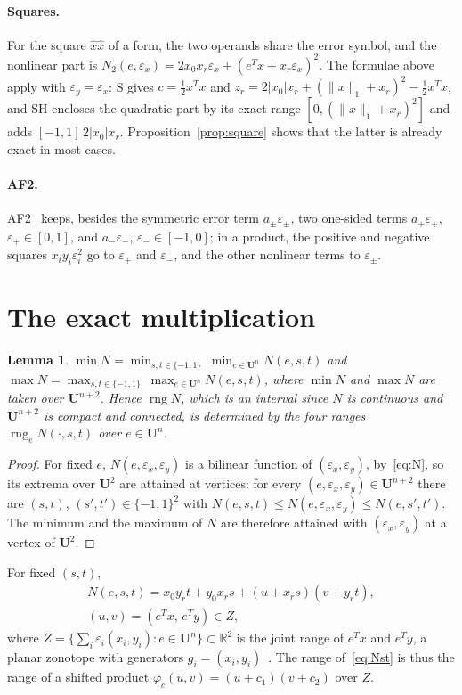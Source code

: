 \documentclass[10pt]{article}
\newtheorem{lemma}[theorem]{Lemma}
\theoremstyle{definition}
\newcommand{\U}{\mathbf{U}}
\newcommand{\R}{\mathbb{R}}
\newcommand{\eps}{\varepsilon}
\newcommand{\ex}{\eps_x}
\newcommand{\ey}{\eps_y}
\newcommand{\rng}{\operatorname{rng}}
\begin{document}
\paragraph{Squares.} For the square $\hat x\hat x$ of a form, the two operands share the error symbol, and the nonlinear part is $N_2(e,\ex)=2x_0x_r\ex+(e^Tx+x_r\ex)^2$. The formulae above apply with $\ey=\ex$: S gives $c=\tfrac12x^Tx$ and $z_r=2|x_0|x_r+(\|x\|_1+x_r)^2-\tfrac12x^Tx$, and SH encloses the quadratic part by its exact range $[0,(\|x\|_1+x_r)^2]$ and adds $[-1,1]\,2|x_0|x_r$. Proposition~\ref{prop:square} shows that the latter is already exact in most cases.

\paragraph{AF2.} AF2~\cite{messine2002extentions} keeps, besides the symmetric error term $a_\pm\eps_\pm$, two one-sided terms $a_+\eps_+$, $\eps_+\in[0,1]$, and $a_-\eps_-$, $\eps_-\in[-1,0]$; in a product, the positive and negative squares $x_iy_i\eps_i^2$ go to $\eps_+$ and $\eps_-$, and the other nonlinear terms to $\eps_\pm$.

\section{The exact multiplication}
\label{sec:exact}

\begin{lemma}
\label{lem:vertices}
$\min N = \min_{s,t\in\{-1,1\}}\ \min_{e\in\U^n} N(e,s,t)$ and $\max N = \max_{s,t\in\{-1,1\}}\ \max_{e\in\U^n} N(e,s,t)$, where $\min N$ and $\max N$ are taken over $\U^{n+2}$. Hence $\rng N$, which is an interval since $N$ is continuous and $\U^{n+2}$ is compact and connected, is determined by the four ranges $\rng_e N(\cdot,s,t)$ over $e\in\U^n$.
\end{lemma}
\begin{proof}
For fixed $e$, $N(e,\ex,\ey)$ is a bilinear function of $(\ex,\ey)$, by~\eqref{eq:N}, so its extrema over $\U^2$ are attained at vertices: for every $(e,\ex,\ey)\in\U^{n+2}$ there are $(s,t)$, $(s',t')\in\{-1,1\}^2$ with $N(e,s,t)\le N(e,\ex,\ey)\le N(e,s',t')$. The minimum and the maximum of $N$ are therefore attained with $(\ex,\ey)$ at a vertex of $\U^2$.
\end{proof}

For fixed $(s,t)$,
\begin{equation}
\label{eq:Nst}
\begin{gathered}N(e,s,t) = x_0y_rt+y_0x_rs + (u + x_rs)(v + y_rt),\\ (u,v)=(e^Tx,\,e^Ty)\in Z,\end{gathered}
\end{equation}
where $Z=\{\sum_i\eps_i(x_i,y_i): e\in\U^n\}\subset\R^2$ is the joint range of $e^Tx$ and $e^Ty$, a planar zonotope with generators $g_i=(x_i,y_i)$~\cite{ziegler1995lectures}. The range of~\eqref{eq:Nst} is thus the range of a shifted product $\varphi_c(u,v)=(u+c_1)(v+c_2)$ over $Z$.
\end{document}
